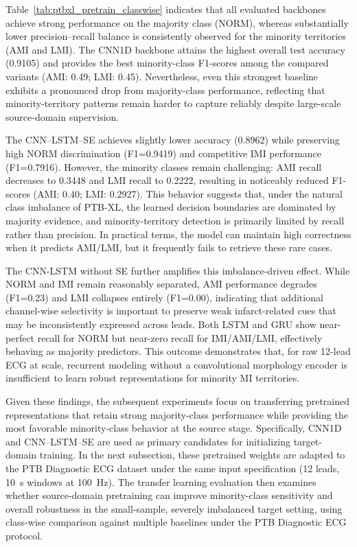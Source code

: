 \documentclass[preprint,12pt]{elsarticle}
\begin{document}
Table~\ref{tab:ptbxl_pretrain_classwise} indicates that all evaluated backbones achieve strong performance on the majority class (NORM), whereas substantially lower precision--recall balance is consistently observed for the minority territories (AMI and LMI). The CNN1D backbone attains the highest overall test accuracy (0.9105) and provides the best minority-class F1-scores among the compared variants (AMI: 0.49; LMI: 0.45). Nevertheless, even this strongest baseline exhibits a pronounced drop from majority-class performance, reflecting that minority-territory patterns remain harder to capture reliably despite large-scale source-domain supervision.

The CNN--LSTM--SE achieves slightly lower accuracy (0.8962) while preserving high NORM discrimination (F1=0.9419) and competitive IMI performance (F1=0.7916). However, the minority classes remain challenging: AMI recall decreases to 0.3448 and LMI recall to 0.2222, resulting in noticeably reduced F1-scores (AMI: 0.40; LMI: 0.2927). This behavior suggests that, under the natural class imbalance of PTB-XL, the learned decision boundaries are dominated by majority evidence, and minority-territory detection is primarily limited by recall rather than precision. In practical terms, the model can maintain high correctness when it predicts AMI/LMI, but it frequently fails to retrieve these rare cases.

The CNN-LSTM without SE further amplifies this imbalance-driven effect. While NORM and IMI remain reasonably separated, AMI performance degrades (F1=0.23) and LMI collapses entirely (F1=0.00), indicating that additional channel-wise selectivity is important to preserve weak infarct-related cues that may be inconsistently expressed across leads. Both LSTM and GRU show near-perfect recall for NORM but near-zero recall for IMI/AMI/LMI, effectively behaving as majority predictors. This outcome demonstrates that, for raw 12-lead ECG at scale, recurrent modeling without a convolutional morphology encoder is insufficient to learn robust representations for minority MI territories.

Given these findings, the subsequent experiments focus on transferring pretrained representations that retain strong majority-class performance while providing the most favorable minority-class behavior at the source stage. Specifically, CNN1D and CNN--LSTM--SE are used as primary candidates for initializing target-domain training. In the next subsection, these pretrained weights are adapted to the PTB Diagnostic ECG dataset under the same input specification (12 leads, 10~s windows at 100~Hz). The transfer learning evaluation then examines whether source-domain pretraining can improve minority-class sensitivity and overall robustness in the small-sample, severely imbalanced target setting, using class-wise comparison against multiple baselines under the PTB Diagnostic ECG protocol.
\end{document}
